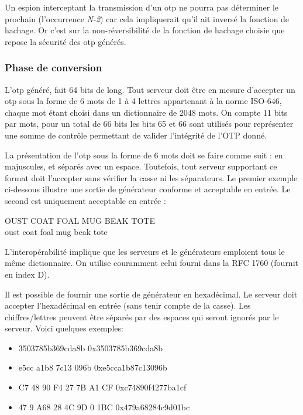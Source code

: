 \documentclass{../res/univ-projet}
\begin{document}
      Un espion interceptant la transmission d'un otp ne pourra pas déterminer 
le prochain (l'occurrence \emph{N-2}) car cela impliquerait qu'il ait inversé la 
fonction de hachage. Or c'est sur la non-réversibilité de la fonction de 
hachage choisie que repose la sécurité des otp générés.\\



    \subsubsection{Phase de conversion}
        L'otp généré, fait 64 bits de long. Tout serveur doit être en mesure 
d'accepter un otp sous la forme de 6 mots de 1 à 4 lettres appartenant à la 
norme ISO-646, chaque mot étant choisi dans un dictionnaire de 2048 mots. On compte 
11 bits par mots, pour un total de 66 bits les bits 65 et 66 sont utilisés pour représenter 
une somme de contrôle permettant de valider l'intégrité de l'OTP donné.

        La présentation de l'otp sous la forme de 6 mots doit se faire comme 
suit : en majuscules, et séparés avec un espace. Toutefois, tout serveur 
supportant ce format doit l'accepter sans vérifier la casse ni les séparateurs. 
Le 
premier exemple ci-dessous illustre une sortie de générateur conforme et 
acceptable en entrée. Le second est uniquement acceptable en entrée :
        \begin{center}
            OUST COAT FOAL MUG BEAK TOTE\\
            oust coat foal mug beak tote
        \end{center}

        L'interopérabilité implique que les serveurs et le générateurs 
emploient tous le même dictionnaire. On utilise couramment celui fourni dans la RFC 1760 
(fournit en index D).

        Il est possible de fournir une sortie de générateur en hexadécimal. Le 
serveur doit accepter l'hexadécimal en entrée (sans tenir compte de la casse). 
Les chiffres/lettres peuvent être séparés par des espaces qui seront ignorés 
par le serveur. Voici quelques exemples:
        \begin{itemize}
            \item 3503785b369cda8b              0x3503785b369cda8b
            \item e5cc a1b8 7c13 096b           0xe5cca1b87c13096b
            \item C7 48 90 F4 27 7B A1 CF       0xc74890f4277ba1cf
            \item 47 9 A68 28 4C 9D 0 1BC       0x479a68284c9d01bc
        \end{itemize}
\end{document}
